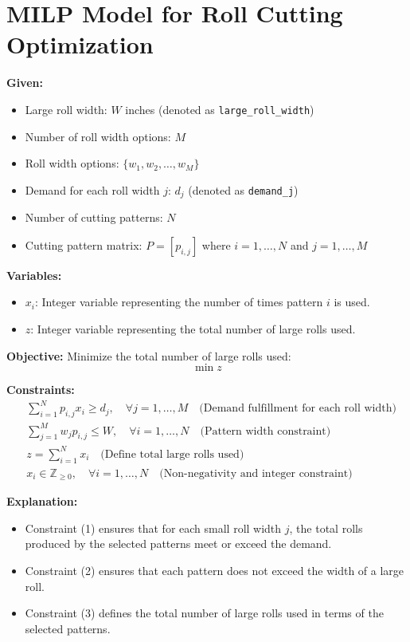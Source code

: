 \documentclass{article}
\begin{document}
\section*{MILP Model for Roll Cutting Optimization}

\textbf{Given:}
\begin{itemize}
    \item Large roll width: \( W \) inches (denoted as \texttt{large\_roll\_width})
    \item Number of roll width options: \( M \)
    \item Roll width options: \( \{w_1, w_2, \ldots, w_M\} \)
    \item Demand for each roll width \( j \): \( d_j \) (denoted as \texttt{demand\_j})
    \item Number of cutting patterns: \( N \)
    \item Cutting pattern matrix: \( P = [p_{i,j}] \) where \( i = 1, \ldots, N \) and \( j = 1, \ldots, M \)
\end{itemize}

\textbf{Variables:}
\begin{itemize}
    \item \( x_i \): Integer variable representing the number of times pattern \( i \) is used.
    \item \( z \): Integer variable representing the total number of large rolls used.
\end{itemize}

\textbf{Objective:}
Minimize the total number of large rolls used:
\[
\min z
\]

\textbf{Constraints:}
\begin{align}
    & \sum_{i=1}^{N} p_{i,j} x_i \geq d_j, \quad \forall j = 1, \ldots, M \quad \text{(Demand fulfillment for each roll width)} \\
    & \sum_{j=1}^{M} w_j p_{i,j} \leq W, \quad \forall i = 1, \ldots, N \quad \text{(Pattern width constraint)} \\
    & z = \sum_{i=1}^{N} x_i \quad \text{(Define total large rolls used)} \\
    & x_i \in \mathbb{Z}_{\geq 0}, \quad \forall i = 1, \ldots, N \quad \text{(Non-negativity and integer constraint)}
\end{align}

\textbf{Explanation:}
\begin{itemize}
    \item Constraint (1) ensures that for each small roll width \( j \), the total rolls produced by the selected patterns meet or exceed the demand.
    \item Constraint (2) ensures that each pattern does not exceed the width of a large roll.
    \item Constraint (3) defines the total number of large rolls used in terms of the selected patterns.
\end{itemize}
\end{document}
